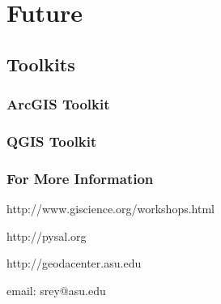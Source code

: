 \documentclass{beamer}
\begin{document}
\begin{frame}
  
\begin{center}
     \begin{figure}
      \end{figure}      
\end{center}
\end{frame}



\section{Future}
\subsection{Toolkits}

\begin{frame}\frametitle{ArcGIS Toolkit}
\begin{center}
     \begin{figure}
      \end{figure}      
\end{center}
\end{frame}

\begin{frame}\frametitle{QGIS Toolkit}
\begin{center}
     \begin{figure}
      \end{figure}      
\end{center}
\end{frame}

\begin{frame}\frametitle{For More Information}

  http://www.giscience.org/workshops.html
  
  http://pysal.org

  http://geodacenter.asu.edu

  email: srey@asu.edu
  
\end{frame}
\end{document}
